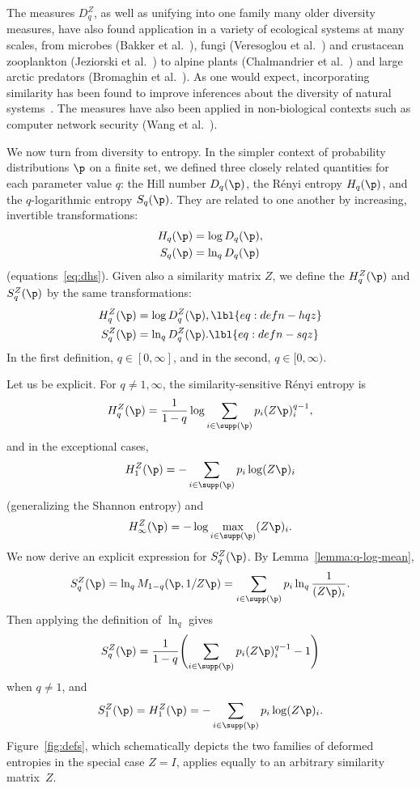 The measures $D_q^Z$, as well as unifying into one family many older
diversity measures, have also found application%
% 
% 
in a variety of ecological systems at many scales, from microbes%
%
% 
(Bakker et al.~\cite{BCMV}), fungi (Veresoglou et al.~\cite{VPDL}) and
crustacean zooplankton (Jeziorski et al.~\cite{JTYP}) to alpine plants
(Chalmandrier et al.~\cite{CMLT}) and large arctic predators (Bromaghin et
al.~\cite{BRBT}).  As one would expect, incorporating similarity has been
found to improve inferences about the diversity of natural
systems~\cite{VPDL}.  The measures have also been applied in non-biological
contexts such as computer%
%
% 
network security (Wang et al.~\cite{WZJS}).

We now turn from diversity to entropy.  In the simpler context of
probability distributions $\p$ on a finite set, we defined three closely
related quantities for each parameter value $q$: the Hill number $D_q(\p)$,
the R\'enyi entropy $H_q(\p)$, and the $q$-logarithmic entropy $S_q(\p)$.
They are related to one another by increasing, invertible transformations:
% 
\begin{align*}
H_q(\p) &= \log D_q(\p),        \\
S_q(\p) &= \ln_q D_q(\p)
\end{align*}
% 
(equations~\eqref{eq:dhs}).
Given also a similarity matrix $Z$, we define the
% 
% 
%
% 
$H_q^Z(\p)$ and %
% 
%
% 
$S_q^Z(\p)$ by the same transformations:
% 
\begin{align}
H_q^Z(\p)       &= \log D_q^Z(\p),      
\lbl{eq:defn-hqz}       \\
S_q^Z(\p)       &= \ln_q D_q^Z(\p).
\lbl{eq:defn-sqz}
\end{align}
% 
In the first definition, $q \in [0, \infty]$, and in the second, $q \in
[0, \infty)$.

Let us be explicit.  For $q \neq 1, \infty$, the similarity-sensitive
R\'enyi entropy is
\[
H_q^Z(\p)
=
\frac{1}{1 - q} \log \sum_{i \in \supp(\p)} p_i (Z\p)_i^{q - 1},
\]
and in the exceptional cases,
\[
H_1^Z(\p)       
=
- \sum_{i \in \supp(\p)} p_i \log (Z\p)_i
\]
(generalizing the Shannon entropy) and 
\[
H_\infty^Z(\p)  
=
- \log \max_{i \in \supp(\p)} (Z\p)_i.  
\]
We now derive an explicit expression for $S_q^Z(\p)$.  By
Lemma~\ref{lemma:q-log-mean},
\[
S_q^Z(\p)
=
\ln_q M_{1 - q}(\p, 1/Z\p)
=
\sum_{i \in \supp(\p)} 
p_i \ln_q \frac{1}{(Z\p)_i}.
\]
Then applying the definition of $\ln_q$ gives 
\[
S_q^Z(\p) 
=
\frac{1}{1 - q}
\Biggl(
\sum_{i \in \supp(\p)} p_i (Z\p)_i^{q - 1} - 1
\Biggr)
\]
when $q \neq 1$, and
\[
S_1^Z(\p) 
=
H_1^Z(\p) 
= 
-\sum_{i \in \supp(\p)} p_i \log (Z\p)_i.
\]
Figure~\ref{fig:defs}, which schematically depicts the two families of
deformed entropies in the special case $Z = I$, applies equally to an
arbitrary similarity matrix~$Z$.

